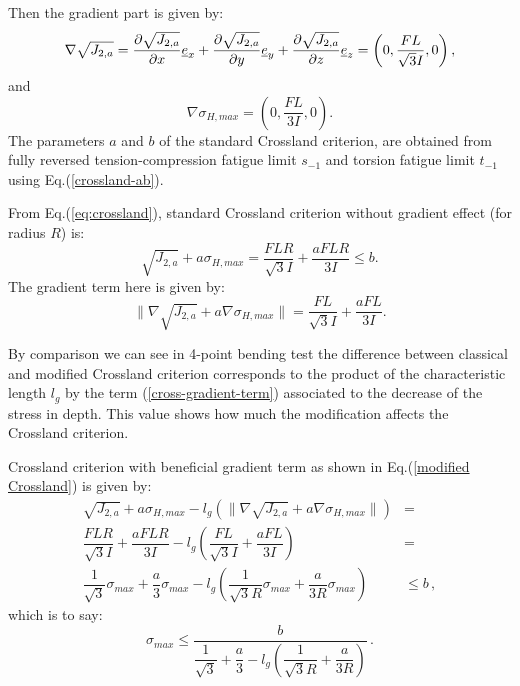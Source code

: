 Then the gradient part is given by:
\begin{equation}
	\nabla\sqrt{J_{2,a}}=\dfrac{\partial\sqrt{J_{2,a}}}{\partial x}\uline{e}_x+\dfrac{\partial\sqrt{J_{2,a}}}{\partial y}\uline{e}_y+\dfrac{\partial\sqrt{J_{2,a}}}{\partial z}\uline{e}_z=\left( 0,\dfrac{FL}{\sqrt{3}I},0\right)  ,
\end{equation}
and
\begin{equation}
	\nabla \sigma_{H,max}=(0,\dfrac{FL}{3I},0).
\end{equation}
The parameters $a$ and $b$ of the standard Crossland criterion, are obtained from fully reversed tension-compression fatigue limit $s_{-1}$  and torsion fatigue limit $t_{-1}$ using Eq.(\ref{crossland-ab}).

From Eq.(\ref{eq:crossland}), standard Crossland criterion without gradient effect (for radius $R$) is:
\begin{equation}
	\sqrt{J_{2,a}}+a\sigma_{H,max}=\dfrac{FLR}{\sqrt{3}I} +\dfrac{aFLR}{3I}\leqslant b.
	\label{eq4pcross}
\end{equation}
The gradient term here is given by:
\begin{equation}
	\parallel{\nabla\sqrt{J_{2,a}}}+a{\nabla \sigma_{H,max}}\parallel=\dfrac{FL}{\sqrt{3}I}+\dfrac{aFL}{3I}.
	\label{cross-gradient-term}
\end{equation}

By comparison we can see in 4-point bending test the difference between classical and modified Crossland criterion corresponds to the product of the characteristic length $l_g$ by the term (\ref{cross-gradient-term}) associated to the decrease of the stress in depth. This value shows how much the modification affects the Crossland criterion. 

\noindent Crossland criterion with beneficial gradient term as shown in Eq.(\ref{modified Crossland}) is given by:
\begin{equation}
	\begin{split}
		\sqrt{J_{2,a}}+a\sigma_{H,max}-l_g(\parallel{\nabla\sqrt{J_{2,a}}}+a\nabla{\sigma_{H,max}}\parallel)&=\\ \dfrac{FLR}{\sqrt{3}I} +\dfrac{aFLR}{3I}-l_g\left( \dfrac{FL}{\sqrt{3}I}+\dfrac{aFL}{3I}\right) 
		&=\\ \dfrac{1}{\sqrt{3}}\sigma_{max}+\dfrac{a}{3}\sigma_{max}-l_g\left( \dfrac{1}{\sqrt{3}R}\sigma_{max}+\dfrac{a}{3R}\sigma_{max}\right) &\leqslant b\, ,
	\end{split}
\end{equation}
which is to say:
\begin{equation}
	\sigma_{max}\leqslant\dfrac{b}{\dfrac{1}{\sqrt{3}}+\dfrac{a}{3}-l_g\left( \dfrac{1}{\sqrt{3}R}+\dfrac{a}{3R}\right) }\, .
\end{equation}


